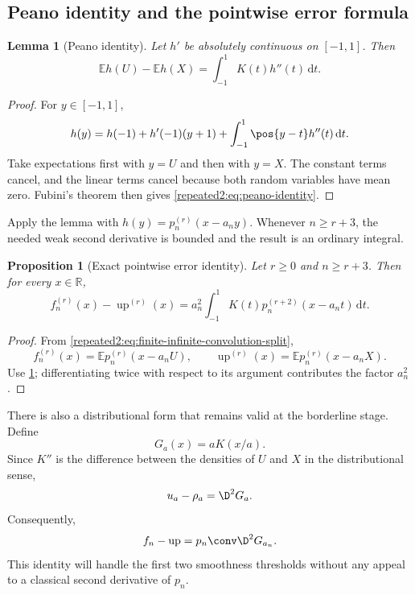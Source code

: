\documentclass[11pt,oneside]{article}
\newtheorem{proposition}[theorem]{Proposition}
\newtheorem{lemma}[theorem]{Lemma}
\theoremstyle{definition}
\theoremstyle{remark}
\newcommand{\R}{\mathbb R}
\newcommand{\Up}{\operatorname{up}}
\newcommand{\dd}{\,\mathrm d}
\newcommand{\E}{\mathbb E}
\begin{document}
\subsection{Peano identity and the pointwise error formula}

\begin{lemma}[Peano identity]
\label{repeated2:lem:peano-identity}
Let $h'$ be absolutely continuous on $[-1,1]$.  Then
\begin{equation}
 \E h(U)-\E h(X)=\int_{-1}^{1}K(t)h''(t)\dd t.
 \label{repeated2:eq:peano-identity}
\end{equation}
\end{lemma}

\begin{proof}
For $y\in[-1,1]$,
\[
 h(y)=h(-1)+h'(-1)(y+1)+\int_{-1}^{1}\pos{y-t}h''(t)\dd t.
\]
Take expectations first with $y=U$ and then with $y=X$.  The constant terms cancel, and
the linear terms cancel because both random variables have mean zero.  Fubini's theorem
then gives \eqref{repeated2:eq:peano-identity}.
\end{proof}

Apply the lemma with $h(y)=p_n^{(r)}(x-a_ny)$.  Whenever $n\ge r+3$, the needed weak
second derivative is bounded and the result is an ordinary integral.

\begin{proposition}[Exact pointwise error identity]
\label{repeated2:prop:pointwise-error}
Let $r\ge0$ and $n\ge r+3$.  Then for every $x\in\R$,
\begin{equation}
 f_n^{(r)}(x)-\Up^{(r)}(x)
 =a_n^2\int_{-1}^{1}K(t)
 p_n^{(r+2)}(x-a_nt)\dd t.
 \label{repeated2:eq:exact-pointwise-error}
\end{equation}
\end{proposition}

\begin{proof}
From \eqref{repeated2:eq:finite-infinite-convolution-split},
\[
 f_n^{(r)}(x)=\E p_n^{(r)}(x-a_nU),
 \qquad
 \Up^{(r)}(x)=\E p_n^{(r)}(x-a_nX).
\]
Use \cref{repeated2:lem:peano-identity}; differentiating twice with respect to its argument contributes
the factor $a_n^2$.
\end{proof}

There is also a distributional form that remains valid at the borderline stage.  Define
\begin{equation}
 G_a(x)=aK(x/a).
 \label{repeated2:eq:Ga-definition}
\end{equation}
Since $K''$ is the difference between the densities of $U$ and $X$ in the distributional
sense,
\begin{equation}
 u_a-\rho_a=\D^2G_a.
 \label{repeated2:eq:kernel-distribution-identity}
\end{equation}
Consequently,
\begin{equation}
 f_n-\Up=p_n\conv\D^2G_{a_n}.
 \label{repeated2:eq:error-distribution-convolution}
\end{equation}
This identity will handle the first two smoothness thresholds without any appeal to a
classical second derivative of $p_n$.
\end{document}

